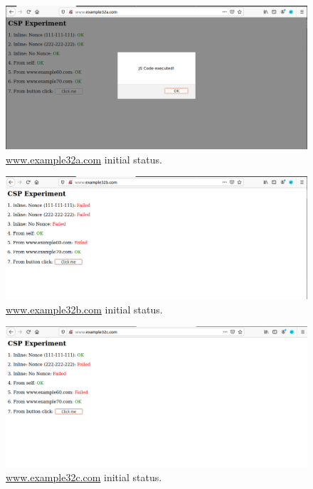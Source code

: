 \begin{figure}[h]
    \centering
    \includegraphics[height=\textheight,width=\textwidth,keepaspectratio]
    {figures/example_a_all_OK.png}
    \caption{\url{www.example32a.com} initial status.}
    \label{fig:exampe_a_init}
\end{figure}

\begin{figure}[h]
    \centering
    \includegraphics[height=\textheight,width=\textwidth,keepaspectratio]
    {figures/example_b_initial.png}
    \caption{\url{www.example32b.com} initial status.}
    \label{fig:example_b_init}
\end{figure}

\begin{figure}[h]
    \centering
    \includegraphics[height=\textheight,width=\textwidth,keepaspectratio]
    {figures/example_c_initial.png}
    \caption{\url{www.example32c.com} initial status.}
    \label{fig:example_c_init}
\end{figure}

